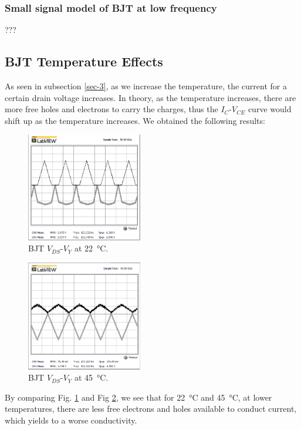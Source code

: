 \documentclass[journal]{IEEEtran}
\begin{document}
\subsubsection{Small signal model of BJT at low frequency}
\par ???
\subsection{BJT Temperature Effects}
\par As seen in subsection \ref{sec-3}, as we increase the temperature, the
current for a certain drain voltage increases. In theory, as
the temperature increases, there are more free holes and
electrons to carry the charges, thus the $I_{C}$-$V_{CE}$ curve would
shift up as the temperature increases. We obtained the following results:
\begin{figure}[h]
  \centering
  \includegraphics[width=0.45\textwidth]{images/4-1.png}
  \caption{BJT $V_{DS}$-$V_{Y}$ at \SI{22}{\celsius}.}
  \label{fig-9}
\end{figure}
\begin{figure}[h]
  \centering
  \includegraphics[width=0.45\textwidth]{images/4-2.png}
  \caption{BJT $V_{DS}$-$V_{Y}$ at \SI{45}{\celsius}.}
  \label{fig-10}
\end{figure}
\par By comparing Fig. \ref{fig-9} and Fig \ref{fig-10}, we see that for \SI{22}{\celsius}
and \SI{45}{\celsius}, at lower temperatures, there are less
free electrons and holes available to conduct current, which yields to a worse conductivity.
\end{document}

